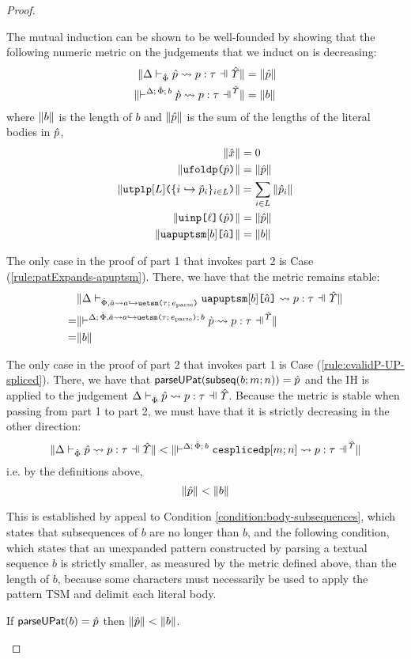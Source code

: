 {{{{\begin{proof}
\begin{enumerate}
\begin{byCases}
      \resetpfcounter
  \end{byCases}
  \end{enumerate}
The mutual induction can be shown to be well-founded by showing that the following numeric metric on the judgements that we induct on is decreasing:
\begin{align*}
\sizeof{\patExpands{\upctx}{\uPhi}{\upv}{p}{\tau}} & = \sizeof{\upv}\\
\sizeof{{\cvalidP{\upctx}{\pscene{\Delta}{\uPhi}{b}}{\cpv}{p}{\tau}}} & = \sizeof{b}
\end{align*}
where $\Vert b \Vert$ is the length of $b$ and $\Vert \hat{p} \Vert$ is the sum of the lengths of the literal bodies in $\hat{p}$,
\begin{align*}
\Vert {\hat x} \Vert & = 0\\
\Vert \texttt{ufoldp}\texttt{(}\hat{p}\texttt{)} \Vert & = \Vert \hat{p} \Vert\\
\Vert \texttt{utplp}[L]\texttt{(}\{i \hookrightarrow \hat{p}_{i}\}_{i \in L}\texttt{)} \Vert & = \sum_{i \in L} \Vert \hat{p}_i \Vert\\
\Vert \texttt{uinp}\texttt{[}\ell\texttt{](}\hat{p}\texttt{)} \Vert & = \Vert \hat{p} \Vert\\
\Vert \texttt{uapuptsm}[b]\texttt{[}\hat{a}\texttt{]} \Vert & = \Vert b \Vert
\end{align*}

The only case in the proof of part 1 that invokes part 2 is Case (\ref{rule:patExpands-apuptsm}). There, we have that the metric remains stable: \begin{align*}
 & \sizeof{\patExpands{\upctx}{\uPhi, \uShyp{\tsmv}{a}{\tau}{\eparse}}{\auapuptsm{b}{\tsmv}}{p}{\tau}}\\
=& \sizeof{{\cvalidP{\upctx}{\pscene{\Delta}{\uPhi, \uShyp{\tsmv}{a}{\tau}{\eparse}}{b}}{\cpv}{p}{\tau}}}\\
=&\sizeof{b}\end{align*}

The only case in the proof of part 2 that invokes part 1 is Case (\ref{rule:cvalidP-UP-spliced}). There, we have that $\mathsf{parseUPat}(\mathsf{subseq}(b; m; n))=\hat{p}$ and the IH is applied to the judgement $\patExpands{\upctx}{\uPhi}{\upv}{p}{\tau}$. Because the metric is stable when passing from part 1 to part 2, we must have that it is strictly decreasing in the other direction:
\[\sizeof{\patExpands{\upctx}{\uPhi}{\upv}{p}{\tau}} < \sizeof{{\cvalidP{\upctx}{\pscene{\Delta}{\uPhi}{b}}{\acesplicedp{m}{n}}{p}{\tau}}}\]
i.e. by the definitions above, 
\[\Vert \hat{p} \Vert < \Vert b \Vert\]

This is established by appeal to Condition \ref{condition:body-subsequences}, which states that subsequences of $b$ are no longer than $b$, and the following condition, which states that an unexpanded pattern constructed by parsing a textual sequence $b$ is strictly smaller, as measured by the metric defined above, than the length of $b$, because some characters must necessarily be used to apply the pattern TSM and delimit each literal body.
\begin{condition}\label{condition:pattern-parsing} If $\mathsf{parseUPat}(b)=\hat{p}$ then $\Vert \hat{p} \Vert < \Vert b \Vert$.\end{condition}


\end{proof}}}}}
